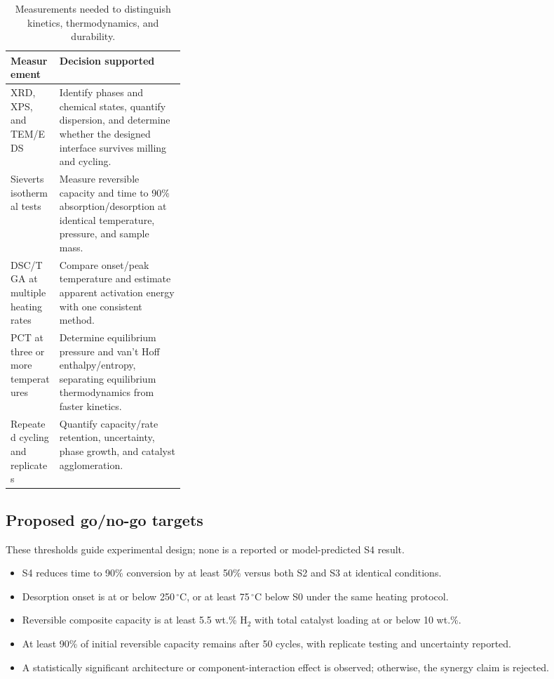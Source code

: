 \documentclass[11pt,a4paper]{article}
\newcommand{\Htwo}{\ensuremath{\mathrm{H}_{2}}}
\newcommand{\wtpct}{wt.\%}
\begin{document}
\begin{table}[H]
\centering
\small
\caption{Measurements needed to distinguish kinetics, thermodynamics, and durability.}
\label{tab:measurements}
\begin{tabularx}{\linewidth}{>{\raggedright\arraybackslash}p{0.29\linewidth} >{\raggedright\arraybackslash}X}
\toprule
\textbf{Measurement} & \textbf{Decision supported} \\
\midrule
XRD, XPS, and TEM/EDS & Identify phases and chemical states, quantify dispersion, and determine whether the designed interface survives milling and cycling. \\
Sieverts isothermal tests & Measure reversible capacity and time to 90\% absorption/desorption at identical temperature, pressure, and sample mass. \\
DSC/TGA at multiple heating rates & Compare onset/peak temperature and estimate apparent activation energy with one consistent method. \\
PCT at three or more temperatures & Determine equilibrium pressure and van't Hoff enthalpy/entropy, separating equilibrium thermodynamics from faster kinetics. \\
Repeated cycling and replicates & Quantify capacity/rate retention, uncertainty, phase growth, and catalyst agglomeration. \\
\bottomrule
\end{tabularx}
\end{table}

\subsection{Proposed go/no-go targets}

These thresholds guide experimental design; none is a reported or model-predicted S4 result.

\begin{itemize}
  \item S4 reduces time to 90\% conversion by at least 50\% versus both S2 and S3 at identical conditions.
  \item Desorption onset is at or below 250\,$^{\circ}$C, or at least 75\,$^{\circ}$C below S0 under the same heating protocol.
  \item Reversible composite capacity is at least 5.5 \wtpct{} \Htwo{} with total catalyst loading at or below 10 \wtpct{}.
  \item At least 90\% of initial reversible capacity remains after 50 cycles, with replicate testing and uncertainty reported.
  \item A statistically significant architecture or component-interaction effect is observed; otherwise, the synergy claim is rejected.
\end{itemize}
\end{document}
